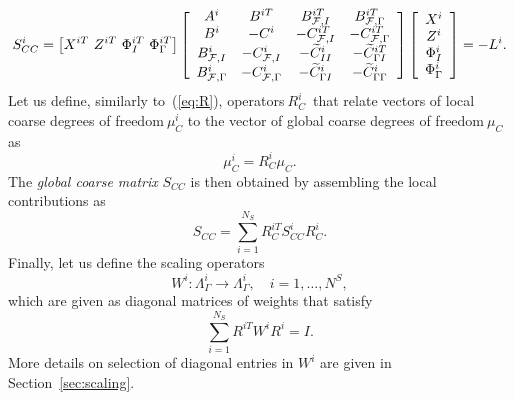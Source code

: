 \begin{equation}
S_{CC}^{i}=\left[
X^{iT}\ Z^{iT}\ \Phi_{I}^{iT}\ \Phi_{\Gamma}^{iT}%
\right]  \left[
\begin{array}
[c]{cccc}%
A^{i} & B^{iT} & B_{\mathcal{F},I}^{iT} & B_{\mathcal{F},\Gamma}^{iT}\\
B^{i} & -C^{i} & -C_{\mathcal{F},I}^{iT} & -C_{\mathcal{F},\Gamma
}^{iT}\\
B_{\mathcal{F},I}^{i} & -C_{\mathcal{F},I}^{i} & -\widetilde{C}_{II}^{i} &
-\widetilde{C}_{{\Gamma}I}^{iT}\\
B_{\mathcal{F},\Gamma}^{i} & -C_{\mathcal{F},\Gamma}^{i} & -\widetilde{C}%
_{{\Gamma}I}^{i} & -\widetilde{C}_{{\Gamma}{\Gamma}}^{i}
\end{array}
\right]  \left[
\begin{array}
[c]{c}%
X^{i}\\
Z^{i}\\
\Phi_{I}^{i}\\
\Phi_{\Gamma}^{i}%
\end{array}
\right]  =-L^{i}. \label{eq:scci_def}%
\end{equation}
Let us define, similarly to~(\ref{eq:R}), operators$~R_{C}^{i}$\ that relate
vectors of local coarse degrees of freedom$~\mu_{C}^{i}$ to
the vector of global coarse degrees of freedom$~\mu_{C}$ as
\begin{equation}
\mu_{C}^{i}=R_{C}^{i}\mu_{C}.
\end{equation}
The \emph{global coarse matrix} $S_{CC}$ is then obtained by assembling the
local contributions as
\begin{equation}
S_{CC}=\sum_{i=1}^{N_{S}}R_{C}^{iT}S_{CC}^{i}R_{C}^{i}. \label{eq:Scc_def}%
\end{equation}
Finally, let us define the scaling operators
\begin{equation}
W^{i}:{\Lambda}_{\Gamma}^{i}\rightarrow{\Lambda}_{\Gamma}^{i},\quad
i=1,\dots,N^{S}, \label{eq:Wi}%
\end{equation}
which are given as diagonal matrices of weights 
that satisfy
\begin{equation}
\sum_{i=1}^{N_{S}}R^{iT}W^{i}R^{i}=I.
\end{equation}
More details on selection of diagonal entries in $W^{i}$ are given in Section~\ref{sec:scaling}.

